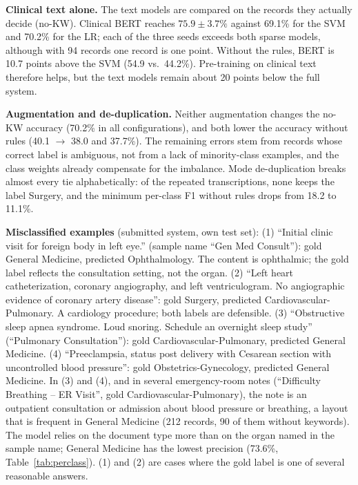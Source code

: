 \documentclass[twocolumn,10pt]{article}
\begin{document}
\noindent\textbf{Clinical text alone.} The text models are compared on the records they actually decide (no-KW). Clinical BERT reaches $75.9 \pm 3.7\%$ against 69.1\% for the \ac{SVM} and 70.2\% for the \ac{LR}; each of the three seeds exceeds both sparse models, although with 94 records one record is one point. Without the rules, BERT is 10.7 points above the \ac{SVM} (54.9 vs.\ 44.2\%). Pre-training on clinical text therefore helps, but the text models remain about 20 points below the full system.

\noindent\textbf{Augmentation and de-duplication.} Neither augmentation changes the no-KW accuracy (70.2\% in all configurations), and both lower the accuracy without rules (40.1 $\rightarrow$ 38.0 and 37.7\%). The remaining errors stem from records whose correct label is ambiguous, not from a lack of minority-class examples, and the class weights already compensate for the imbalance. Mode de-duplication breaks almost every tie alphabetically: of the repeated transcriptions, none keeps the label Surgery, and the minimum per-class F1 without rules drops from 18.2 to 11.1\%.

\noindent\textbf{Misclassified examples} (submitted system, own test set):
(1) ``Initial clinic visit for foreign body in left eye.'' (sample name ``Gen Med Consult''): gold General Medicine, predicted Ophthalmology. The content is ophthalmic; the gold label reflects the consultation setting, not the organ.
(2) ``Left heart catheterization, coronary angiography, and left ventriculogram. No angiographic evidence of coronary artery disease'': gold Surgery, predicted Cardiovascular-Pulmonary. A cardiology procedure; both labels are defensible.
(3) ``Obstructive sleep apnea syndrome. Loud snoring. Schedule an overnight sleep study'' (``Pulmonary Consultation''): gold Cardiovascular-Pulmonary, predicted General Medicine.
(4) ``Preeclampsia, status post delivery with Cesarean section with uncontrolled blood pressure'': gold Obstetrics-Gynecology, predicted General Medicine.
In (3) and (4), and in several emergency-room notes (``Difficulty Breathing -- ER Visit'', gold Cardiovascular-Pulmonary), the note is an outpatient consultation or admission about blood pressure or breathing, a layout that is frequent in General Medicine (212 records, 90 of them without keywords). The model relies on the document type more than on the organ named in the sample name; General Medicine has the lowest precision (73.6\%, Table~\ref{tab:perclass}). (1) and (2) are cases where the gold label is one of several reasonable answers.
\end{document}
